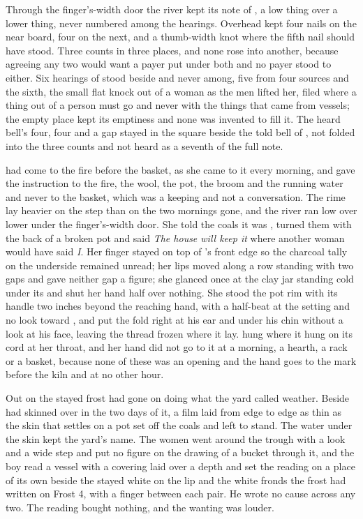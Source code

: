 Through the finger's-width door the river kept its note of , a low thing over a lower thing, never numbered among the hearings. Overhead  kept four nails on the near board, four on the next, and a thumb-width knot where the fifth nail should have stood. Three counts in three places, and none rose into another, because agreeing any two would want a payer put under both and no payer stood to either. Six hearings of  stood beside and never among, five from four sources and the sixth, the small flat knock out of a woman as the men lifted her, filed where a thing out of a person must go and never with the things that came from vessels; the empty place kept its emptiness and none was invented to fill it. The heard bell's four, four and a gap stayed in the square beside the told bell of , not folded into the three counts and not heard as a seventh of the full note.

 had come to the fire before the basket, as she came to it every morning, and gave the instruction to the fire, the wool, the pot, the broom and the running water and never to the basket, which was a keeping and not a conversation. The rime lay heavier on the step than on the two mornings gone, and the river ran low over lower under the finger's-width door. She told the coals it was , turned them with the back of a broken pot and said \emph{The house will keep it} where another woman would have said \emph{I}. Her finger stayed on top of 's front edge so the charcoal tally on the underside remained unread; her lips moved along a row standing with two gaps and gave neither gap a figure; she glanced once at the clay jar standing cold under its  and shut her hand half over nothing. She stood the pot rim with its handle two inches beyond the reaching hand, with a half-beat at the setting and no look toward , and put the fold right at his ear and under his chin without a look at his face, leaving the thread frozen where it lay.  hung where it hung on its cord at her throat, and her hand did not go to it at a morning, a hearth, a rack or a basket, because none of these was an opening and the hand goes to the mark before the kiln and at no other hour.

Out on  the stayed frost had gone on doing what the yard called weather. Beside   had skinned over in the two days of it, a film laid from edge to edge as thin as the skin that settles on a pot set off the coals and left to stand. The water under the skin kept the yard's name. The women went around the trough with a look and a wide step and put no figure on the drawing of a bucket through it, and the boy read a vessel with a covering laid over a depth and set the reading on a place of its own beside the stayed white on the lip and the white fronds the frost had written on Frost 4, with a finger between each pair. He wrote no cause across any two. The reading bought nothing, and the wanting was louder.

